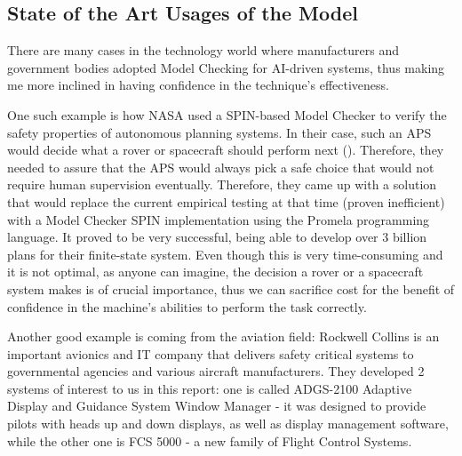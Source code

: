 \documentclass[paper=a4, fontsize=11pt]{scrartcl} %
\numberwithin{equation}{section} %
\numberwithin{figure}{section} %
\numberwithin{table}{section} %
\begin{document}

\subsection{State of the Art Usages of the Model}

\par
There are many cases in the technology world where manufacturers and government bodies adopted Model Checking for AI-driven systems, thus making me more inclined in having confidence in the technique's effectiveness. \\

\par
One such example is how NASA used a SPIN-based Model Checker to verify the safety properties of autonomous planning systems. In their case, such an APS  would decide what a rover or spacecraft should perform next (\citet{nasa-spin}). Therefore, they needed to assure that the APS would always pick a safe choice that would not require human supervision eventually. Therefore, they came up with a solution that would replace the current empirical testing at that time (proven inefficient) with a Model Checker SPIN implementation using the Promela programming language. It proved to be very successful, being able to develop over 3 billion plans for their finite-state system. Even though this is very time-consuming and it is not optimal, as anyone can imagine, the decision a rover or a spacecraft system makes is of crucial importance, thus we can sacrifice cost for the benefit of confidence in the machine's abilities to perform the task correctly. \\

\par
Another good example is coming from the aviation field: Rockwell Collins is an important avionics and IT company that delivers safety critical systems to governmental agencies and various aircraft manufacturers. They developed 2 systems of interest to us in this report: one is called ADGS-2100 Adaptive Display and Guidance System Window Manager - it was designed to provide pilots with heads up and down displays, as well as display management software, while the other one is FCS 5000 - a new family of Flight Control Systems. \\
\end{document}
